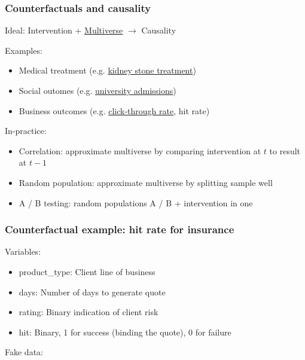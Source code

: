 \begin{frame}
\frametitle{Counterfactuals and causality}
Ideal: Intervention + \href{https://en.wikipedia.org/wiki/Multiverse}{Multiverse} $\rightarrow$ Causality\newline

Examples:
\begin{itemize}
\item Medical treatment (e.g. \href{https://en.wikipedia.org/wiki/Simpson\%27s_paradox\#Kidney_stone_treatment}{kidney stone treatment})
\item Social outomes (e.g. \href{https://en.wikipedia.org/wiki/Simpson\%27s_paradox\#UC_Berkeley_gender_bias}{university admissions})
\item Business outcomes (e.g. \href{https://en.wikipedia.org/wiki/Click-through\_rate}{click-through rate}, hit rate)\newline
\end{itemize}

In-practice:
\begin{itemize}
    \item Correlation: approximate multiverse by comparing intervention at $t$ to result at $t-1$
    \item Random population: approximate multiverse by splitting sample well
    \item A / B testing: random populations A / B + intervention in one
\end{itemize}
\end{frame}




\begin{frame}
\frametitle{Counterfactual example: hit rate for insurance}
Variables:
\begin{itemize}
\item product\_type: Client line of business
\item days: Number of days to generate quote
\item rating: Binary indication of client risk
\item hit: Binary, 1 for success (binding the quote), 0 for failure\newline
\end{itemize}

Fake data:\newline\newline
\newline
\end{frame}


